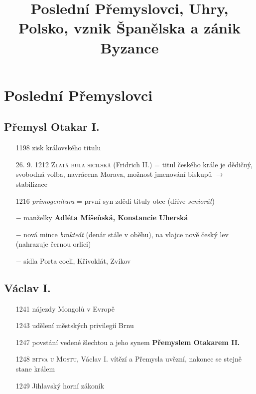 \documentclass{article}
\title{\vspace{-2cm}Poslední Přemyslovci, Uhry, Polsko, vznik Španělska a zánik Byzance\vspace{-1.7cm}}
\date{}
\author{}
\begin{document}
\maketitle

\section*{Poslední Přemyslovci}
\subsection*{Přemysl Otakar I.}
\begin{itemize}
    \vspace{-0.5em}
    \setlength\itemsep{0.15em}
    \item[1198] zisk královského titulu
    \item[26. 9. 1212] \textsc{Zlatá bula sicilská} (Fridrich II.) = titul českého krále je dědičný, svobodná volba, navrácena Morava, možnost jmenování biskupů $\rightarrow$ stabilizace
    \item[1216] \textit{primogenitura} = první syn zdědí tituly otce (dříve \textit{seniorát})
    \item[$-$] manželky \textbf{Adléta Míšeňská, Konstancie Uherská}
    \item[$-$] nová mince \textit{brakteát} (denár stále v oběhu), na vlajce nově český lev (nahrazuje černou orlici)
    \item[$-$] sídla Porta coeli, Křivoklát, Zvíkov
\end{itemize}

\subsection*{Václav I.}
\begin{itemize}
    \vspace{-0.5em}
    \setlength\itemsep{0.15em}
    \item[1241] nájezdy Mongolů v Evropě
    \item[1243] udělení městských privilegií Brnu
    \item[1247] povstání vedené šlechtou a jeho synem \textbf{Přemyslem Otakarem II.}
    \item[1248] \textsc{bitva u Mostu}, Václav I. vítězí a Přemysla uvězní, nakonec se stejně stane králem
    \item[1249] Jihlavský horní zákoník
\end{itemize}
\end{document}
